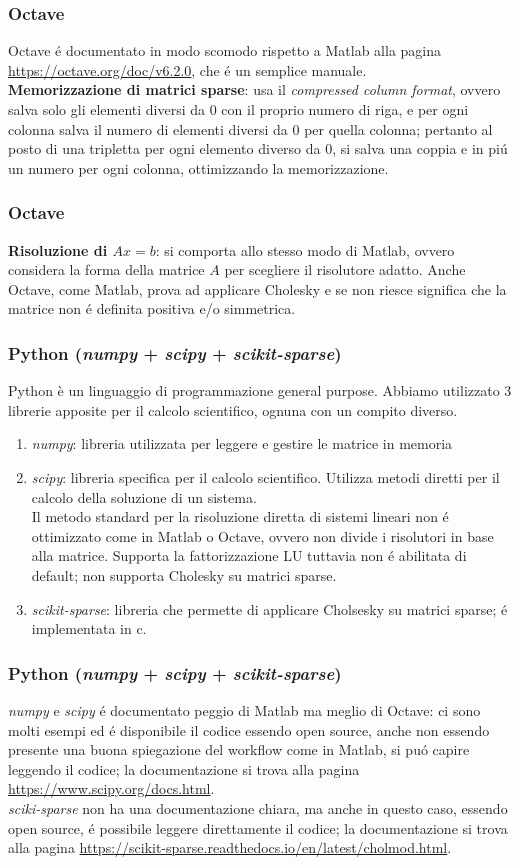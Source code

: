 \documentclass{beamer}
\begin{document}
\begin{frame}
\frametitle{Octave}
Octave \'e documentato in modo scomodo rispetto a Matlab alla pagina \url{https://octave.org/doc/v6.2.0}, che \'e un semplice manuale. \\
\textbf{Memorizzazione di matrici sparse}: usa il \textit{compressed column format}, ovvero salva solo gli elementi diversi da 0 con il proprio numero di riga, e per ogni colonna salva il numero di elementi diversi da 0 per quella colonna; pertanto al posto di una tripletta per ogni elemento diverso da 0, si salva una coppia e in pi\'u un numero per ogni colonna, ottimizzando la memorizzazione.
\end{frame} 
\begin{frame}
\frametitle{Octave}
\textbf{Risoluzione di $Ax = b$}: si comporta allo stesso modo di Matlab, ovvero considera la forma della matrice $A$ per scegliere il risolutore adatto. Anche Octave, come Matlab, prova ad applicare Cholesky e se non riesce significa che la matrice non \'e definita positiva e/o simmetrica.
\end{frame}

\begin{frame}
\frametitle{Python (\textit{numpy} + \textit{scipy} + \textit{scikit-sparse})}
Python è un linguaggio di programmazione general purpose. Abbiamo utilizzato 3 librerie apposite per il calcolo scientifico, ognuna con un compito diverso.
\begin{enumerate}
\item \textit{numpy}: libreria utilizzata per leggere e gestire le matrice in memoria
\item \textit{scipy}: libreria specifica per il calcolo scientifico. Utilizza metodi diretti per il calcolo della soluzione di un sistema.\\
Il metodo standard per la risoluzione diretta di sistemi lineari non \'e ottimizzato come in Matlab o Octave, ovvero non divide i risolutori in base alla matrice. Supporta la fattorizzazione LU tuttavia non \'e abilitata di default; non supporta Cholesky su matrici sparse.
\item \textit{scikit-sparse}: libreria che permette di applicare Cholsesky su matrici sparse; \'e implementata in c.
\end{enumerate}
\end{frame}
\begin{frame}
\frametitle{Python (\textit{numpy} + \textit{scipy} + \textit{scikit-sparse})}
\textit{numpy} e \textit{scipy} \'e documentato peggio di Matlab ma meglio di Octave: ci sono molti esempi ed \'e disponibile il codice essendo open source, anche non essendo presente una buona spiegazione del workflow come in Matlab, si pu\'o capire leggendo il codice; la documentazione si trova alla pagina \url{https://www.scipy.org/docs.html}.\\ \textit{sciki-sparse} non ha una documentazione chiara, ma anche in questo caso, essendo open source, \'e possibile leggere direttamente il codice; la documentazione si trova alla pagina \url{https://scikit-sparse.readthedocs.io/en/latest/cholmod.html}.
\end{frame}
\end{document}
